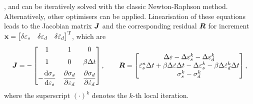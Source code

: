 ,  and  can be iteratively solved with the classic Newton-Raphson method. Alternatively, other optimisers can be applied. Linearisation of these equations leads to the Jacobian matrix $\bm{J}$ and the corresponding residual $\bm{R}$ for increment $\mathbf{x}=\begin{bmatrix}\delta\varepsilon_s&\delta\varepsilon_d&\delta\dot\varepsilon_d\end{bmatrix}^{\mathrm{T}}$, which are
\begin{gather}
\bm{J}=-\begin{bmatrix}
	1                                          & 1                               & 0                                   \\[2mm]
	1                                          & 0                               & \beta\Delta{}t                      \\[2mm]
	-\dfrac{\mathrm{d}\sigma_s}{\mathrm{d}\varepsilon_s} & \dfrac{\partial{\sigma_d}}{\partial{\varepsilon_d}} & \dfrac{\partial{\sigma_d}}{\partial{\dot\varepsilon_d}}
\end{bmatrix},\qquad
\bm{R}=\begin{bmatrix}
	\Delta\varepsilon-\Delta\varepsilon_s^k-\Delta\varepsilon_d^k                                                                  \\
	\dot\varepsilon^n_s\Delta{}t+\beta\Delta\dot\varepsilon\Delta{}t-\Delta\varepsilon_s^k-\beta\Delta\dot\varepsilon_d^k\Delta{}t \\
	\sigma^k_s-\sigma^k_d
\end{bmatrix},
\end{gather}
where the superscript $\left(\cdot\right)^k$ denotes the $k$-th local iteration.

